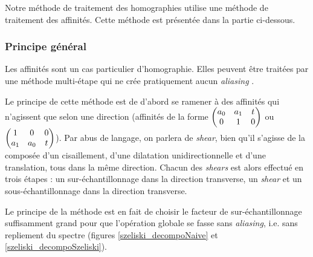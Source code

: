 Notre méthode de traitement des homographies utilise une méthode de traitement des affinités. Cette méthode est présentée dans la partie ci-dessous.
\subsubsection{Principe général}
	
	Les affinités sont un cas particulier d'homographie. Elles peuvent être traitées par une méthode multi-étape qui ne crée pratiquement aucun \emph{aliasing} \cite{szeliski2010high}.

	Le principe de cette méthode est de d'abord se ramener à des affinités qui n'agissent que selon une direction (affinités de la forme $\begin{pmatrix} a_0 & a_1 & t\\ 0 & 1 & 0 \end{pmatrix}$ ou $\begin{pmatrix} 1 & 0 & 0\\ a_1 & a_0 & t \end{pmatrix}$). Par abus de langage, on parlera de \emph{shear}, bien qu'il s'agisse de la composée d'un cisaillement, d'une dilatation unidirectionnelle et d'une translation, tous dans la même direction. Chacun des \emph{shears} est alors effectué en trois étapes : un sur-échantillonnage dans la direction transverse, un \emph{shear} et un sous-échantillonnage dans la direction transverse. 
	
	Le principe de la méthode est en fait de choisir le facteur de sur-échantillonnage suffisamment grand pour que l'opération globale se fasse sans \emph{aliasing}, i.e. sans repliement du spectre (figures \ref{szeliski_decompoNaive} et \ref{szeliski_decompoSzeliski}).
		

